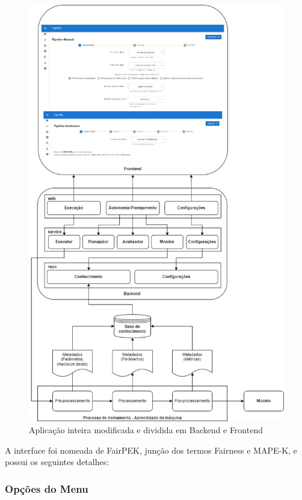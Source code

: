 \documentclass[portugues]{ic-tese}
\begin{document}
\begin{figure}[H]
\centering
\includegraphics[scale=0.4]{images/backend-frontend-ml.jpg}
\caption {Aplicação inteira modificada e dividida em Backend e Frontend}
\label{fig:BackendFrontendML}
\end{figure}

A interface foi nomeada de FairPEK, junção dos termos Fairness e MAPE-K, e possui os seguintes detalhes:

\subsubsection{Opções do Menu}
\end{document}
